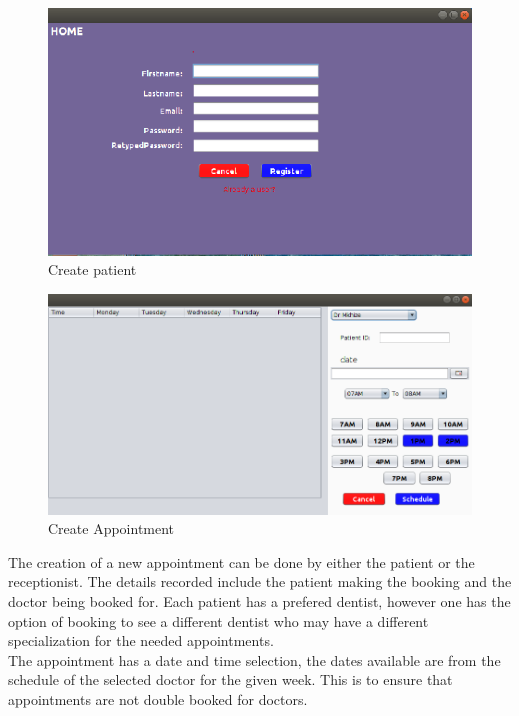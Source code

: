 \documentclass[11 pt]{article}
\begin{document}
\begin{figure}[h]
    \centering 
    \includegraphics[width=\linewidth]{new_receptionist.png}
    \caption{Create patient}
    \label{fig:Create New Receptionist}
    \end{figure}
    
    \begin{figure}[h]
    \centering 
    \includegraphics[width=\linewidth]{new_appointment.png}
    \caption{Create Appointment}
    \label{fig:Appointment}
    \end{figure}
    The creation  of a new appointment can be done by either the patient or the receptionist. The details recorded include the patient making the booking and the doctor being booked for. Each patient has a prefered dentist, however one has the option of booking to see a different dentist who may have a different specialization for the needed appointments. \\
The appointment has a date and time selection, the dates available are from the schedule of the selected doctor for the given week. This is to ensure that appointments are not double booked for doctors. 
\end{document}
